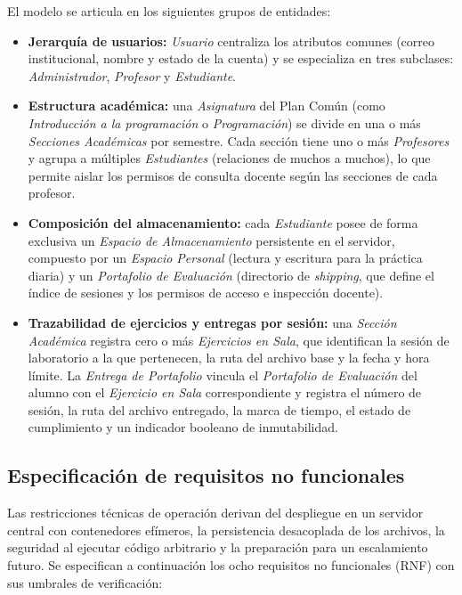 El modelo se articula en los siguientes grupos de entidades:
\begin{itemize}
    \item \textbf{Jerarquía de usuarios:} \textit{Usuario} centraliza los atributos comunes (correo institucional, nombre y estado de la cuenta) y se especializa en tres subclases: \textit{Administrador}, \textit{Profesor} y \textit{Estudiante}.
    \item \textbf{Estructura académica:} una \textit{Asignatura} del Plan Común (como \textit{Introducción a la programación} o \textit{Programación}) se divide en una o más \textit{Secciones Académicas} por semestre. Cada sección tiene uno o más \textit{Profesores} y agrupa a múltiples \textit{Estudiantes} (relaciones de muchos a muchos), lo que permite aislar los permisos de consulta docente según las secciones de cada profesor.
    \item \textbf{Composición del almacenamiento:} cada \textit{Estudiante} posee de forma exclusiva un \textit{Espacio de Almacenamiento} persistente en el servidor, compuesto por un \textit{Espacio Personal} (lectura y escritura para la práctica diaria) y un \textit{Portafolio de Evaluación} (directorio de \textit{shipping}, que define el índice de sesiones y los permisos de acceso e inspección docente).
    \item \textbf{Trazabilidad de ejercicios y entregas por sesión:} una \textit{Sección Académica} registra cero o más \textit{Ejercicios en Sala}, que identifican la sesión de laboratorio a la que pertenecen, la ruta del archivo base y la fecha y hora límite. La \textit{Entrega de Portafolio} vincula el \textit{Portafolio de Evaluación} del alumno con el \textit{Ejercicio en Sala} correspondiente y registra el número de sesión, la ruta del archivo entregado, la marca de tiempo, el estado de cumplimiento y un indicador booleano de inmutabilidad.
\end{itemize}

\subsection{Especificación de requisitos no funcionales}
\label{subsec:requisitos_no_funcionales}

Las restricciones técnicas de operación derivan del despliegue en un servidor central con contenedores efímeros, la persistencia desacoplada de los archivos, la seguridad al ejecutar código arbitrario y la preparación para un escalamiento futuro. Se especifican a continuación los ocho requisitos no funcionales (RNF) con sus umbrales de verificación:

